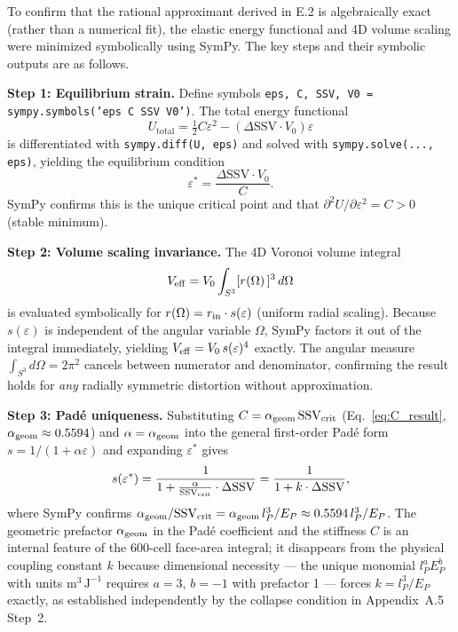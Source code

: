 \documentclass[11pt,letterpaper]{article}
\begin{document}
To confirm that the rational approximant derived in E.2 is algebraically exact (rather than a numerical fit), the elastic energy functional and 4D volume scaling were minimized symbolically using SymPy. The key steps and their symbolic outputs are as follows.

\textbf{Step 1: Equilibrium strain.}
Define symbols \texttt{eps, C, SSV, V0 = sympy.symbols('eps C SSV V0')}. 
The total energy functional
\begin{equation}
U_{\text{total}} = \tfrac{1}{2}C\varepsilon^2 - (\Delta\text{SSV}\cdot V_0)\varepsilon
\end{equation}
is differentiated with \texttt{sympy.diff(U, eps)} and solved with 
\texttt{sympy.solve(..., eps)}, yielding the equilibrium condition
\[
\varepsilon^* = \frac{\Delta\text{SSV}\cdot V_0}{C}.
\]
SymPy confirms this is the unique critical point and that 
$\partial^2 U/\partial\varepsilon^2 = C > 0$ (stable minimum).

\textbf{Step 2: Volume scaling invariance.}
The 4D Voronoi volume integral
\[
V_{\rm eff} = V_0\int_{S^3} [r(\Omega)\,]^3\,d\Omega
\] 
is evaluated symbolically for $r(\Omega) = r_{\rm in}\cdot s(\varepsilon)$ (uniform radial scaling). Because $s(\varepsilon)$ is independent of the angular variable $\Omega$, SymPy factors it out of the integral immediately, yielding $V_{\rm eff} = V_0\,s(\varepsilon)^4$ exactly. The angular measure $\int_{S^3}d\Omega = 2\pi^2$ cancels between numerator and denominator, 
confirming the result holds for \emph{any} radially symmetric distortion without approximation.

\textbf{Step 3: Padé uniqueness.}
Substituting $C = \alpha_{\rm geom}\,\text{SSV}_{\rm crit}$
(Eq.~\ref{eq:C_result}, $\alpha_{\rm geom} \approx 0.5594$) and
$\alpha = \alpha_{\rm geom}$ into the general first-order Padé form 
$s = 1/(1+\alpha\varepsilon)$ and expanding $\varepsilon^*$ gives
\[
s(\varepsilon^*) = \frac{1}{1 + \frac{\alpha}{\text{SSV}_{\rm crit}} 
\cdot \Delta\text{SSV}} = \frac{1}{1 + k\cdot\Delta\text{SSV}},
\]
where SymPy confirms $\alpha_{\rm geom}/\text{SSV}_{\rm crit} =
\alpha_{\rm geom}\,l_P^3/E_P \approx 0.5594\,l_P^3/E_P$.
The geometric prefactor $\alpha_{\rm geom}$ in the Padé coefficient
and the stiffness $C$ is an internal feature of the 600-cell
face-area integral; it disappears from the physical coupling
constant $k$ because dimensional necessity — the unique monomial 
$l_P^a E_P^b$ with units $\text{m}^3\,\text{J}^{-1}$ requires 
$a=3$, $b=-1$ with prefactor 1 — forces $k = l_P^3/E_P$ exactly, 
as established independently by the collapse condition in 
Appendix~A.5 Step~2.
\end{document}
